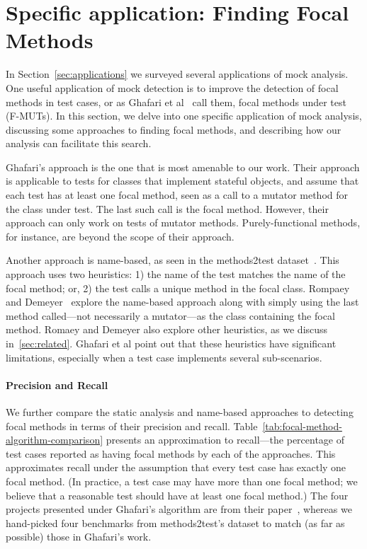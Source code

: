 \section{Specific application: Finding Focal Methods}
\label{sec:focal}

In Section~\ref{sec:applications} we surveyed several applications of mock analysis.
One useful application of mock detection is to
improve the detection of focal methods in test cases, or as Ghafari et
al~\cite{ghafari15:_autom} call them, focal methods under test
(F-MUTs). In this section, we delve into one specific application of mock analysis, 
discussing some approaches to finding
focal methods, and describing how our analysis can facilitate this search.

Ghafari's approach is the one that is most amenable to our work.
Their approach is applicable to tests for classes that implement
stateful objects, and assume that each test has at least one focal
method, seen as a call to a mutator method for the class under test.
The last such call is the focal method. However, their approach can
only work on tests of mutator methods.  Purely-functional methods, for
instance, are beyond the scope of their approach.

Another approach is name-based, as seen in the methods2test
dataset~\cite{tufano2020unit}.  This approach uses two heuristics: 1)
the name of the test matches the name of the focal method; or, 2) the
test calls a unique method in the focal class. Rompaey and
Demeyer~\cite{rompaey09:_estab_traceab_links_unit_test} explore the
name-based approach along with simply using the last method called---not necessarily a mutator---as the class containing the focal method.  Romaey and Demeyer also
explore other heuristics, as we discuss in~\ref{sec:related}. Ghafari et al point out
that these heuristics have significant limitations, especially when a
test case implements several sub-scenarios.

\paragraph{Precision and Recall}
We further compare the static analysis and name-based approaches to detecting focal methods in terms of their precision and recall. Table~\ref{tab:focal-method-algorithm-comparison} presents an approximation to recall---the percentage of test cases reported as having focal methods by each of the approaches. This approximates recall under the assumption that every test case has exactly one focal method. (In practice, a test case may have more than one focal method; we believe that a reasonable test should have at least one focal method.) The four projects presented under Ghafari's algorithm are from their paper~\cite{ghafari15:_autom}, whereas we hand-picked four benchmarks from methods2test's dataset to match (as far as possible) those in Ghafari's work.

